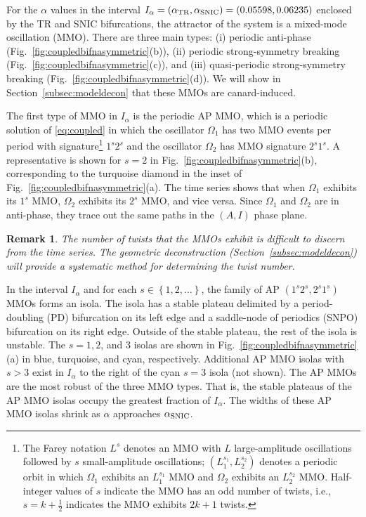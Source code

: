 \documentclass[10pt,onecolumn]{article}
\theoremstyle{plain}
\newtheorem{remark}{Remark}[section]
\begin{document}
For the $\alpha$ values in the interval $I_{\alpha} = (\alpha_{\rm TR},\alpha_{\rm SNIC}) = (0.05598,0.06235)$ enclosed by the TR and SNIC bifurcations, the attractor of the system is a mixed-mode oscillation (MMO).
There are three main types:
(i) periodic anti-phase (Fig.~\ref{fig:coupledbifnasymmetric}(b)),
(ii) periodic strong-symmetry breaking (Fig.~\ref{fig:coupledbifnasymmetric}(c)), and
(iii) quasi-periodic strong-symmetry breaking (Fig.~\ref{fig:coupledbifnasymmetric}(d)). 
We will show in Section~\ref{subsec:modeldecon} that these MMOs are canard-induced. 
  
The first type of MMO in $I_{\alpha}$ is the periodic AP MMO, which is a periodic solution of \eqref{eq:coupled} in which the oscillator $\Omega_1$ has two MMO events per period with signature\footnote{The Farey notation $L^s$ denotes an MMO with $L$ large-amplitude oscillations followed by $s$ small-amplitude oscillations; $(L_1^{s_1}, L_2^{s_2})$ denotes a periodic orbit in which $\Omega_1$ exhibits an $L_1^{s_1}$ MMO and $\Omega_2$ exhibits an $L_2^{s_2}$ MMO. Half-integer values of $s$ indicate the MMO has an odd number of twists, i.e., $s=k+\tfrac{1}{2}$ indicates the MMO exhibits $2k+1$ twists.} $1^{s} 2^{s}$ and the oscillator $\Omega_2$ has MMO signature $2^{s} 1^{s}$. 
A representative is shown for $s=2$ in Fig.~\ref{fig:coupledbifnasymmetric}(b), corresponding to the turquoise diamond in the inset of Fig.~\ref{fig:coupledbifnasymmetric}(a). 
The time series shows that when $\Omega_1$ exhibits its $1^s$ MMO, $\Omega_2$ exhibits its $2^s$ MMO, and vice versa. 
Since $\Omega_1$ and $\Omega_2$ are in anti-phase, they trace out the same paths in the $(A,I)$ phase plane. 

\medskip
\begin{remark}
The number of twists that the MMOs exhibit is difficult to discern from the time series. 
The geometric deconstruction (Section~\ref{subsec:modeldecon}) will provide a systematic method for determining the twist number. 
\end{remark}

In the interval $I_{\alpha}$ and for each $s \in \left\{ 1,2,\ldots \right\}$, the family of AP $(1^{s} 2^{s},2^{s} 1^{s})$ MMOs forms an isola.  
The isola has a stable plateau delimited by a period-doubling (PD) bifurcation on its left edge and a saddle-node of periodics (SNPO) bifurcation on its right edge. 
Outside of the stable plateau, the rest of the isola is unstable. 
The $s=1,2$, and $3$ isolas are shown in Fig.~\ref{fig:coupledbifnasymmetric}(a) in blue, turquoise, and cyan, respectively. 
Additional AP MMO isolas with $s>3$ exist in $I_{\alpha}$ to the right of the cyan $s=3$ isola (not shown). 
The AP MMOs are the most robust of the three MMO types. 
That is, the stable plateaus of the AP MMO isolas occupy the greatest fraction of $I_{\alpha}$. 
The widths of these AP MMO isolas shrink as $\alpha$ approaches $\alpha_{\rm SNIC}$. 
\end{document}
